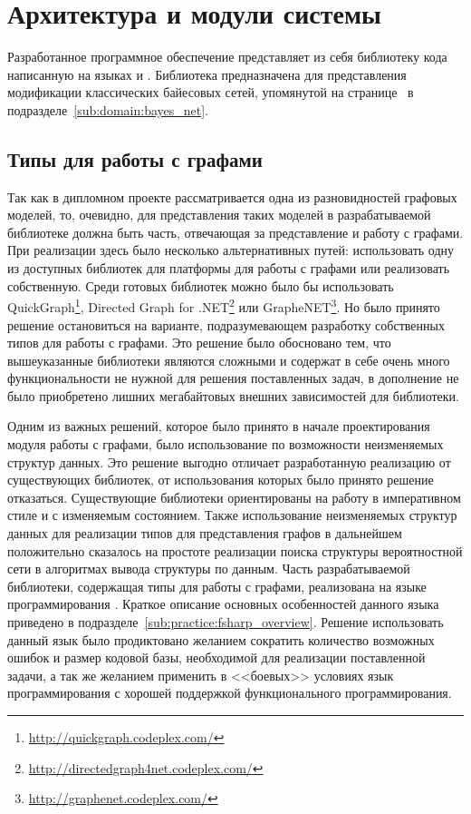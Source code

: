 
\section{Архитектура и модули системы} %
\label{sec:arch_and_mod}

Разработанное программное обеспечение представляет из себя библиотеку кода написанную на языках \fsharp{} и \csharp{}.
Библиотека предназначена для представления модификации классических байесовых сетей, упомянутой на странице~\pageref{page:domain:bayes_mod} в подразделе~\ref{sub:domain:bayes_net}.

\subsection{Типы для работы с графами}
\label{sub:arch_and_mod:graphlib}

Так как в дипломном проекте рассматривается одна из разновидностей графовых моделей, то, очевидно, для представления таких моделей в разрабатываемой библиотеке должна быть часть, отвечающая за представление и работу с графами.
При реализации здесь было несколько альтернативных путей: использовать одну из доступных библиотек для платформы \dotnet{} для работы с графами или реализовать собственную.
Среди готовых библиотек можно было бы использовать QuickGraph\footnote{\url{http://quickgraph.codeplex.com/}}, Directed Graph for .NET\footnote{\url{http://directedgraph4net.codeplex.com/}} или GrapheNET\footnote{\url{http://graphenet.codeplex.com/}}.
Но было принято решение остановиться на варианте, подразумевающем разработку собственных типов для работы с графами.
Это решение было обосновано тем, что вышеуказанные библиотеки являются сложными и содержат в себе очень много функциональности не нужной для решения поставленных задач, в дополнение не было приобретено лишних мегабайтовых внешних зависимостей для библиотеки.

Одним из важных решений, которое было принято в начале проектирования модуля работы с графами, было использование по возможности неизменяемых структур данных.
Это решение выгодно отличает разработанную реализацию от существующих библиотек, от использования которых было принято решение отказаться. 
Существующие библиотеки ориентированы на работу в императивном стиле и с изменяемым состоянием.
Также использование неизменяемых структур данных для реализации типов для представления графов в дальнейшем положительно сказалось на простоте реализации поиска структуры вероятностной сети в алгоритмах вывода структуры по данным.
Часть разрабатываемой библиотеки, содержащая типы для работы с графами, реализована на языке программирования \fsharp{}.
Краткое описание основных особенностей данного языка приведено в подразделе~\ref{sub:practice:fsharp_overview}.
Решение использовать данный язык было продиктовано желанием сократить количество возможных ошибок и размер кодовой базы, необходимой для реализации поставленной задачи, а так же желанием применить в <<боевых>> условиях язык программирования с хорошей поддержкой функционального программирования.

